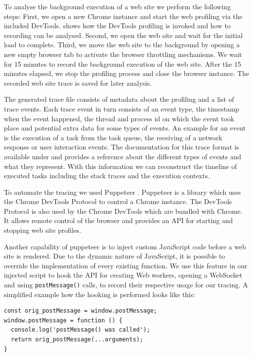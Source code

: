 \documentclass[
	ruledheaders=section,%
	class=report,%
	thesis={type=bachelor},%
	accentcolor=9c,%
	custommargins=true,%
	marginpar=false,%
	parskip=half-,%
	fontsize=11pt,%
]{tudapub}
\begin{document}
  To analyse the background execution of a web site we perform the following steps: First, we open a new Chrome instance and start the web profiling via the included DevTools. \cite{chrome-devtools-performance-reference} shows how the DevTools profiling is invoked and how to recording can be analysed. Second, we open the web site and wait for the initial load to complete. Third, we move the web site to the background by opening a new empty browser tab to activate the browser throttling mechanisms. We wait for 15 minutes to record the background execution of the web site. After the 15 minutes elapsed, we stop the profiling process and close the browser instance. The recorded web site trace is saved for later analysis.
  
  The generated trace file consists of metadata about the profiling and a list of trace events. Each trace event in turn consists of an event type, the timestamp when the event happened, the thread and process id on which the event took place and potential extra data for some types of events. An example for an event is the execution of a task from the task queue, the receiving of a network response or user interaction events. The documentation for this trace format is available under \cite{trace-event-format} and \cite{timeline-event-reference} provides a reference about the different types of events and what they represent. With this information we can reconstruct the timeline of executed tasks including the stack traces and the execution contexts.
    
  To automate the tracing we used Puppeteer \cite{pptr}. Puppeteer is a library which uses the Chrome DevTools Protocol \cite{chrome-devtools-protocol} to control a Chrome instance. The DevTools Protocol is also used by the Chrome DevTools which are bundled with Chrome. It allows remote control of the browser and provides an API for starting and stopping web site profiles.

  Another capability of puppeteer is to inject custom JavaScript code before a web site is rendered. Due to the dynamic nature of JavaScript, it is possible to override the implementation of every existing function. We use this feature in our injected script to hook the API for creating Web workers, opening a WebSocket and using \texttt{postMessage()} calls, to record their respective usage for our tracing. A simplified example how the hooking is performed looks like this:

\begin{lstlisting}
const orig_postMessage = window.postMessage;
window.postMessage = function () {
  console.log('postMessage() was called');
  return orig_postMessage(...arguments);
}
\end{lstlisting}
\end{document}
